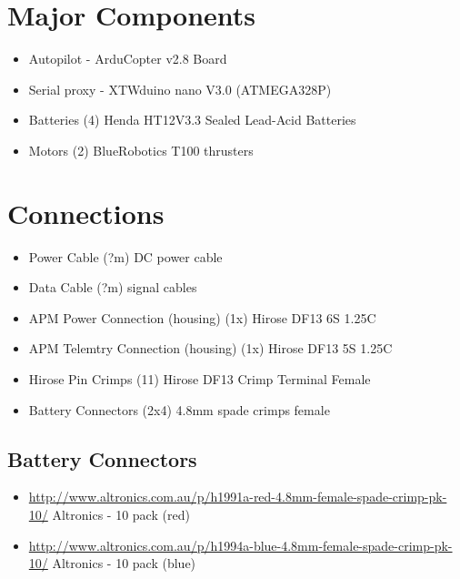 \documentclass{article}
\begin{document}
\section{Major Components}
\begin{itemize}
\item{Autopilot} - ArduCopter v2.8 Board
\item{Serial proxy} - XTWduino nano V3.0 (ATMEGA328P)
\item{Batteries} (4) Henda HT12V3.3 Sealed Lead-Acid Batteries
\item{Motors} (2) BlueRobotics T100 thrusters
\end{itemize}

\section{Connections}
\begin{itemize}
\item{Power Cable} (?m) DC power cable
\item{Data Cable} (?m) signal cables
\item{APM Power Connection (housing)} (1x) Hirose DF13 6S 1.25C
\item{APM Telemtry Connection (housing)} (1x) Hirose DF13 5S 1.25C
\item{Hirose Pin Crimps} (11) Hirose DF13 Crimp Terminal Female
\item{Battery Connectors} (2x4) 4.8mm spade crimps female
\end{itemize}

\subsection{Battery Connectors}
\begin{itemize}
\item \url{http://www.altronics.com.au/p/h1991a-red-4.8mm-female-spade-crimp-pk-10/} Altronics - 10 pack (red)
\item \url{http://www.altronics.com.au/p/h1994a-blue-4.8mm-female-spade-crimp-pk-10/} Altronics - 10 pack (blue)
\end{itemize}
\end{document}
